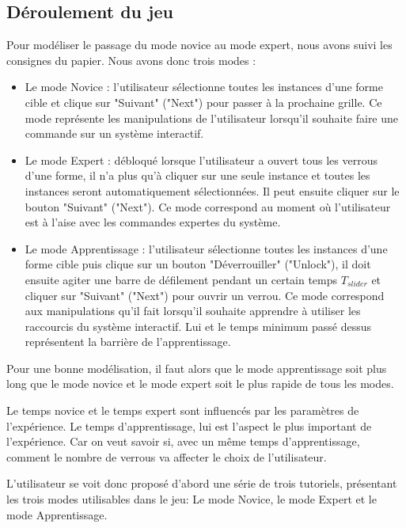 \documentclass[a4paper, 12pt]{report}
\begin{document}
        \subsection{Déroulement du jeu}
        Pour modéliser le passage du mode novice au mode expert, nous avons suivi les consignes du papier\cite{bailly}.
        Nous avons donc trois modes :
        \begin{itemize}
            \item Le mode Novice : l'utilisateur sélectionne toutes les instances d'une forme cible et clique sur "Suivant" ("Next") pour passer à la prochaine grille. Ce mode représente les manipulations de l'utilisateur lorsqu'il souhaite faire une commande sur un système interactif.
            \item Le mode Expert : débloqué lorsque l'utilisateur a ouvert tous les verrous d'une forme, il 
            n'a plus qu'à cliquer sur une seule instance et toutes les instances seront automatiquement sélectionnées. Il peut ensuite cliquer sur le bouton "Suivant" ("Next"). Ce mode correspond au moment où l'utilisateur est à l'aise avec les commandes expertes du système.
            \item Le mode Apprentissage : l'utilisateur sélectionne toutes les instances d'une forme cible puis clique 
            sur un bouton "Déverrouiller" ("Unlock"), il doit ensuite agiter une barre de défilement pendant un certain temps $T_{slider}$ et cliquer sur "Suivant" ("Next") pour ouvrir un verrou. 
            Ce mode correspond aux manipulations qu'il fait lorsqu'il souhaite apprendre à utiliser les raccourcis du système interactif. Lui et le temps minimum passé dessus représentent la barrière de l'apprentissage.
        \end{itemize}
        
        Pour une bonne modélisation, il faut alors que le mode apprentissage soit plus long que le mode novice et le mode expert soit le plus rapide de tous les modes.
    
        Le temps novice et le temps expert sont influencés par les paramètres de l'expérience.
        Le temps d'apprentissage, lui est l'aspect le plus important de l'expérience. Car on veut savoir si, 
        avec un même temps d'apprentissage, comment le nombre de verrous va affecter le choix de 
        l'utilisateur.
        
        L'utilisateur se voit donc proposé d'abord une série de trois tutoriels, présentant les trois modes
        utilisables dans le jeu: Le mode Novice, le mode Expert et le mode Apprentissage.
        
\end{document}
